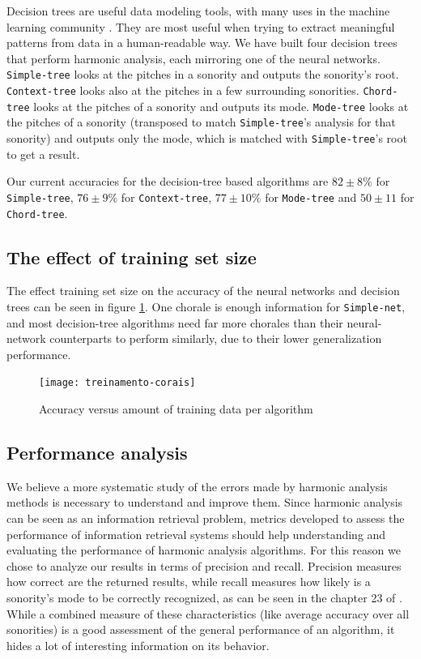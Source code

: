 \documentclass{article}
\begin{document}
Decision trees are useful data modeling tools, with many uses in the
machine learning community \cite{mitchell:machine,
  russell.ea:artificial}. They are most useful when trying to extract
meaningful patterns from data in a human-readable way. We have built
four decision trees that perform harmonic analysis, each mirroring one
of the neural networks. \texttt{Simple-tree} looks at the pitches in a
sonority and outputs the sonority's root. \texttt{Context-tree} looks
also at the pitches in a few surrounding
sonorities. \texttt{Chord-tree} looks at the pitches of a sonority and
outputs its mode. \texttt{Mode-tree} looks at the pitches of a
sonority (transposed to match \texttt{Simple-tree}'s analysis for that
sonority) and outputs only the mode, which is matched with
\texttt{Simple-tree}'s root to get a result.

Our current accuracies for the decision-tree based algorithms are $82
\pm 8\%$ for \texttt{Simple-tree}, $76 \pm 9\%$ for
\texttt{Context-tree}, $77 \pm 10\%$ for \texttt{Mode-tree} and $50
\pm 11$ for \texttt{Chord-tree}.

\subsection{The effect of training set size}

The effect training set size on the accuracy of the neural networks
and decision trees can be seen in figure
\ref{fig:treinamento-corais}. One chorale is enough information for
\texttt{Simple-net}, and most decision-tree algorithms need far more
chorales than their neural-network counterparts to perform similarly,
due to their lower generalization performance.

\begin{figure}
  \texttt{[image: treinamento-corais]}
  \caption{Accuracy versus amount of training data per algorithm}
  \label{fig:treinamento-corais}
\end{figure}


\subsection{Performance analysis}
\label{sec:common-errors}

We believe a more systematic study of the errors made by harmonic
analysis methods is necessary to understand and improve them. Since
harmonic analysis can be seen as an information retrieval problem,
metrics developed to assess the performance of information retrieval
systems should help understanding and evaluating the performance of
harmonic analysis algorithms. For this reason we chose to analyze our
results in terms of precision and recall. Precision measures how
correct are the returned results, while recall measures how likely is
a sonority's mode to be correctly recognized, as can be seen in the
chapter 23 of \cite{russell.ea:artificial}. While a combined measure
of these characteristics (like average accuracy over all sonorities)
is a good assessment of the general performance of an algorithm, it
hides a lot of interesting information on its behavior.
\end{document}
